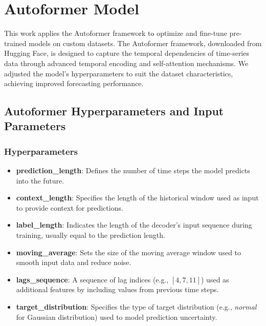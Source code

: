 \section{Autoformer Model}
\label{sec:Autoformer}

This work applies the Autoformer framework to optimize and fine-tune pre-trained models on custom datasets. The Autoformer framework, downloaded from Hugging Face, is designed to capture the temporal dependencies of time-series data through advanced temporal encoding and self-attention mechanisms. We adjusted the model's hyperparameters to suit the dataset characteristics, achieving improved forecasting performance.

\subsection{Autoformer Hyperparameters and Input Parameters}
\label{subsec:AutoformerParams}

\subsubsection{Hyperparameters}
\begin{itemize}
	\item \textbf{prediction\_length}: Defines the number of time steps the model predicts into the future.
	\item \textbf{context\_length}: Specifies the length of the historical window used as input to provide context for predictions.
	\item \textbf{label\_length}: Indicates the length of the decoder's input sequence during training, usually equal to the prediction length.
	\item \textbf{moving\_average}: Sets the size of the moving average window used to smooth input data and reduce noise.
	\item \textbf{lags\_sequence}: A sequence of lag indices (e.g., \([4, 7, 11]\)) used as additional features by including values from previous time steps.
	\item \textbf{target\_distribution}: Specifies the type of target distribution (e.g., \textit{normal} for Gaussian distribution) used to model prediction uncertainty.
\end{itemize}

